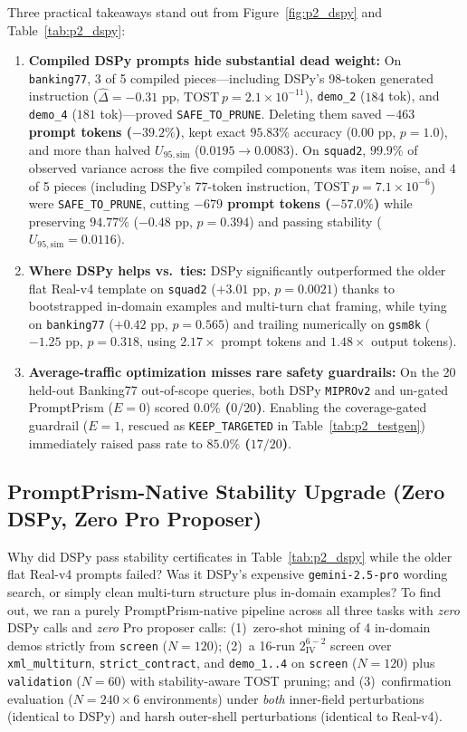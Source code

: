 \documentclass[11pt,a4paper]{article}
\newcommand{\method}{PromptPrism}
\begin{document}
Three practical takeaways stand out from Figure~\ref{fig:p2_dspy} and Table~\ref{tab:p2_dspy}:
\begin{enumerate}[leftmargin=*,nosep]
    \item \textbf{Compiled DSPy prompts hide substantial dead weight:} On \texttt{banking77}, 3 of 5 compiled pieces---including DSPy's 98-token generated instruction ($\hat{\Delta} = -0.31\text{ pp}$, $\mathrm{TOST}\ p = 2.1\times 10^{-11}$), \texttt{demo\_2} ($184$ tok), and \texttt{demo\_4} ($181$ tok)---proved \texttt{SAFE\_TO\_PRUNE}. Deleting them saved \textbf{$-463$ prompt tokens ($-39.2\%$)}, kept exact \textbf{$95.83\%$} accuracy ($0.00\text{ pp}$, $p = 1.0$), and more than halved $U_{95,\mathrm{sim}}$ ($0.0195 \to 0.0083$). On \texttt{squad2}, $99.9\%$ of observed variance across the five compiled components was item noise, and 4 of 5 pieces (including DSPy's 77-token instruction, $\mathrm{TOST}\ p = 7.1\times 10^{-6}$) were \texttt{SAFE\_TO\_PRUNE}, cutting \textbf{$-679$ prompt tokens ($-57.0\%$)} while preserving $94.77\%$ ($-0.48\text{ pp}$, $p = 0.394$) and passing stability ($U_{95,\mathrm{sim}} = 0.0116$).
    \item \textbf{Where DSPy helps vs.\ ties:} DSPy significantly outperformed the older flat Real-v4 template on \texttt{squad2} ($+3.01\text{ pp}$, $p = 0.0021$) thanks to bootstrapped in-domain examples and multi-turn chat framing, while tying on \texttt{banking77} ($+0.42\text{ pp}$, $p = 0.565$) and trailing numerically on \texttt{gsm8k} ($-1.25\text{ pp}$, $p = 0.318$, using $2.17\times$ prompt tokens and $1.48\times$ output tokens).
    \item \textbf{Average-traffic optimization misses rare safety guardrails:} On the 20 held-out Banking77 out-of-scope queries, both DSPy \texttt{MIPROv2} and un-gated \method{} ($E=0$) scored \textbf{$0.0\%$ ($0/20$)}. Enabling the coverage-gated guardrail ($E=1$, rescued as \texttt{KEEP\_TARGETED} in Table~\ref{tab:p2_testgen}) immediately raised pass rate to \textbf{$85.0\%$ ($17/20$)}.
\end{enumerate}

\subsection{\method{}-Native Stability Upgrade (Zero DSPy, Zero Pro Proposer)}
\label{sec:native_stability}
Why did DSPy pass stability certificates in Table~\ref{tab:p2_dspy} while the older flat Real-v4 prompts failed? Was it DSPy's expensive \texttt{gemini-2.5-pro} wording search, or simply clean multi-turn structure plus in-domain examples? To find out, we ran a purely \method{}-native pipeline across all three tasks with \emph{zero} DSPy calls and \emph{zero} Pro proposer calls: (1)~zero-shot mining of 4 in-domain demos strictly from \texttt{screen} ($N=120$); (2)~a 16-run $2^{6-2}_{\mathrm{IV}}$ screen over \texttt{xml\_multiturn}, \texttt{strict\_contract}, and \texttt{demo\_1..4} on \texttt{screen} ($N=120$) plus \texttt{validation} ($N=60$) with stability-aware TOST pruning; and (3)~confirmation evaluation ($N=240 \times 6$ environments) under \emph{both} inner-field perturbations (identical to DSPy) and harsh outer-shell perturbations (identical to Real-v4).
\end{document}
